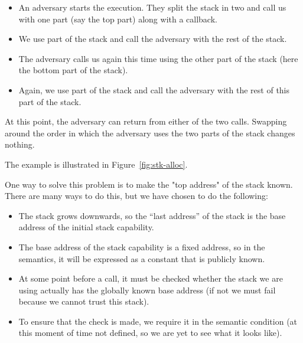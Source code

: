 \documentclass[a4paper]{article}
\begin{document}
\begin{itemize}
  \item An adversary starts the execution. They split the stack in two and call us with one part (say the top part) along with a callback.
  \item We use part of the stack and call the adversary with the rest of the stack.
  \item The adversary calls us again this time using the other part of the stack (here the bottom part of the stack).
  \item Again, we use part of the stack and call the adversary with the rest of this part of the stack.
\end{itemize}
At this point, the adversary can return from either of the two calls. Swapping around the order in which the adversary uses the two parts of the stack changes nothing.

The example is illustrated in Figure~\ref{fig:stk-alloc}.

One way to solve this problem is to make the "top address" of the stack known. There are many ways to do this, but we have chosen to do the following:
\begin{itemize}
\item The stack grows downwards, so the ``last address'' of the stack is the base address of the initial stack capability.
\item The base address of the stack capability is a fixed address, so in the semantics, it will be expressed as a constant that is publicly known.
\item At some point before a call, it must be checked whether the stack we are using actually has the globally known base address (if not we must fail because we cannot trust this stack).
\item To ensure that the check is made, we require it in the semantic condition (at this moment of time not defined, so we are yet to see what it looks like).
\end{itemize}
\end{document}
